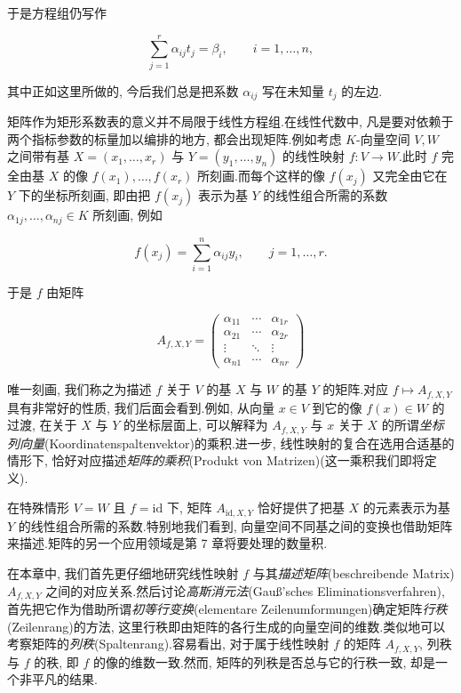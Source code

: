 于是方程组仍写作

\[
\sum_{j = 1}^{r}\alpha_{ij}t_j = \beta_i, \qquad i = 1, \ldots, n,
\]

其中正如这里所做的, 今后我们总是把系数 $\alpha_{ij}$ 写在未知量 $t_j$ 的左边.

矩阵作为矩形系数表的意义并不局限于线性方程组.在线性代数中, 凡是要对依赖于两个指标参数的标量加以编排的地方, 都会出现矩阵.例如考虑 $K$-向量空间 $V, W$ 之间带有基 $X = (x_1, \ldots, x_r)$ 与 $Y = (y_1, \ldots, y_n)$ 的线性映射 $f \colon V \longrightarrow W$.此时 $f$ 完全由基 $X$ 的像 $f(x_1), \ldots, f(x_r)$ 所刻画.而每个这样的像 $f(x_j)$ 又完全由它在 $Y$ 下的坐标所刻画, 即由把 $f(x_j)$ 表示为基 $Y$ 的线性组合所需的系数 $\alpha_{1j}, \ldots, \alpha_{nj} \in K$ 所刻画, 例如

\[
f(x_j) = \sum_{i = 1}^{n}\alpha_{ij}y_i, \qquad j = 1, \ldots, r\text{.}
\]

于是 $f$ 由矩阵

\[
A_{f, X, Y} =
\begin{pmatrix}
\alpha_{11} & \cdots & \alpha_{1r} \\
\alpha_{21} & \cdots & \alpha_{2r} \\
\vdots & \ddots & \vdots \\
\alpha_{n1} & \cdots & \alpha_{nr}
\end{pmatrix}
\]

唯一刻画, 我们称之为描述 $f$ 关于 $V$ 的基 $X$ 与 $W$ 的基 $Y$ 的矩阵.对应 $f \longmapsto A_{f, X, Y}$ 具有非常好的性质, 我们后面会看到.例如, 从向量 $x \in V$ 到它的像 $f(x) \in W$ 的过渡, 在关于 $X$ 与 $Y$ 的坐标层面上, 可以解释为 $A_{f, X, Y}$ 与 $x$ 关于 $X$ 的所谓\emph{坐标列向量}(\textup{Koordinatenspaltenvektor})的乘积.进一步, 线性映射的复合在选用合适基的情形下, 恰好对应描述\emph{矩阵的乘积}(\textup{Produkt von Matrizen})(这一乘积我们即将定义).

在特殊情形 $V = W$ 且 $f = \mathrm{id}$ 下, 矩阵 $A_{\mathrm{id}, X, Y}$ 恰好提供了把基 $X$ 的元素表示为基 $Y$ 的线性组合所需的系数.特别地我们看到, 向量空间不同基之间的变换也借助矩阵来描述.矩阵的另一个应用领域是第 7 章将要处理的数量积.

在本章中, 我们首先更仔细地研究线性映射 $f$ 与其\emph{描述矩阵}(\textup{beschreibende Matrix}) $A_{f, X, Y}$ 之间的对应关系.然后讨论\emph{高斯消元法}(\textup{Gauß'sches Eliminationsverfahren}), 首先把它作为借助所谓\emph{初等行变换}(\textup{elementare Zeilenumformungen})确定矩阵\emph{行秩}(\textup{Zeilenrang})的方法, 这里行秩即由矩阵的各行生成的向量空间的维数.类似地可以考察矩阵的\emph{列秩}(\textup{Spaltenrang}).容易看出, 对于属于线性映射 $f$ 的矩阵 $A_{f, X, Y}$, 列秩与 $f$ 的秩, 即 $f$ 的像的维数一致.然而, 矩阵的列秩是否总与它的行秩一致, 却是一个非平凡的结果.

